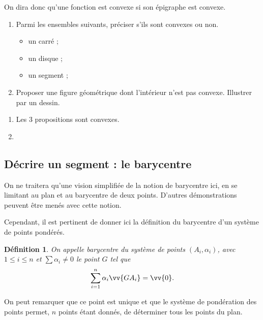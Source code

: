 \documentclass[12pt,a4paper,french]{article}
\theoremstyle{break}
\newtheorem{definition}{Définition}
\theoremstyle{plain}
\theoremstyle{nonumberplain}
\theoremstyle{nonumberbreak}
\begin{document}
On dira donc qu'une fonction est convexe si son épigraphe est convexe.

\begin{question}[ID=convexe.parties]
  \begin{enumerate}
    \item Parmi les ensembles suivants, préciser s'ils sont convexes ou
      non.
      \begin{itemize}
        \item un carré ;
        \item un disque ;
        \item un segment ;
      \end{itemize}
    \item Proposer une figure géométrique dont l'intérieur n'est pas
      convexe. Illustrer par un dessin.
  \end{enumerate}
\end{question}
\begin{solution}
  \begin{enumerate}
    \item Les 3 propositions sont convexes.
    \item

  \end{enumerate}
\end{solution}


\subsection{Décrire un segment : le barycentre}

On ne traitera qu'une vision simplifiée de la notion de barycentre ici,
en se limitant au plan et au barycentre de deux points. D'autres
démonstrations peuvent être menés avec cette notion.

Cependant, il est pertinent de donner ici la définition du barycentre
d'un système de points pondérés.

\begin{definition}
  On appelle \emph{barycentre} du système de points $(A_i, \alpha_i)$,
  avec $1 \leqslant i \leqslant n$ et $\sum \alpha_i \neq 0$ le point
  $G$ tel que \[ \sum_{i=1}^n \alpha_i \vv{GA_i} = \vv{0}.\]
\end{definition}

On peut remarquer que ce point est unique et que le système de
pondération des points permet, $n$ points étant donnés, de déterminer
tous les points du plan.
\end{document}
